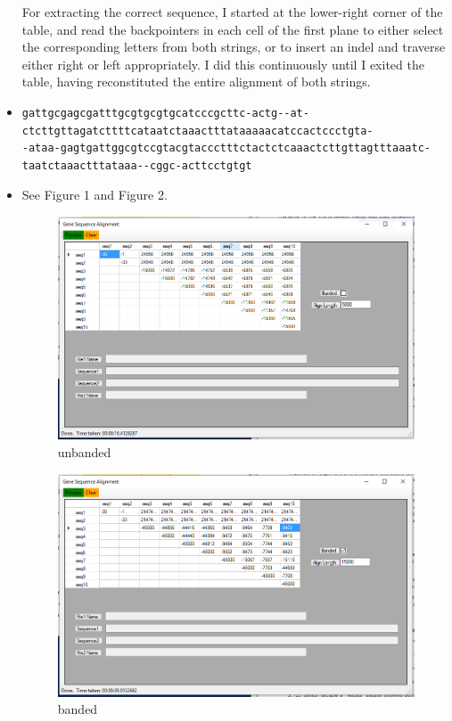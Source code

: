 \documentclass{article}
\begin{document}
\begin{itemize}
    For extracting the correct sequence, I started at the lower-right corner of the table, and read the 
    backpointers in each cell of the first plane to either select the corresponding letters from both 
    strings, or to insert an indel and traverse either right or left appropriately.  I did this continuously
    until I exited the table, having reconstituted the entire alignment of both strings.
    \item \begin{lstlisting}
gattgcgagcgatttgcgtgcgtgcatcccgcttc-actg--at-ctcttgttagatcttttcataatctaaactttataaaaacatccactccctgta-
-ataa-gagtgattggcgtccgtacgtaccctttctactctcaaactcttgttagtttaaatc-taatctaaactttataaa--cggc-acttcctgtgt
    \end{lstlisting}
    \item See Figure 1 and Figure 2.
    \begin{figure}[p]
        \centering
        \includegraphics[resolution=72, width=\textwidth]{Capture}
        \caption{unbanded}
    \end{figure}
        \begin{figure}[p]
        \centering
        \includegraphics[resolution=72, width=\textwidth]{Capture2}
        \caption{banded}
    \end{figure}
\end{itemize}
\end{document}

